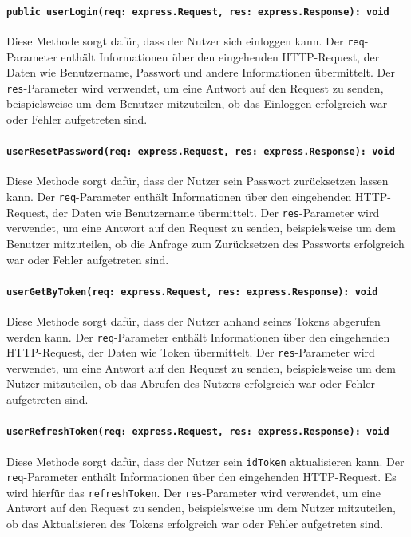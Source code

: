 \documentclass{entwurfsheft}
\begin{document}
\paragraph{\texttt{public userLogin(req: express.Request, res: express.Response): void}}
Diese Methode sorgt dafür, dass der Nutzer sich einloggen kann. Der \texttt{req}-Parameter enthält Informationen über den eingehenden HTTP-Request, der Daten wie Benutzername, Passwort und andere Informationen übermittelt. Der \texttt{res}-Parameter wird verwendet, um eine Antwort auf den Request zu senden, beispielsweise um dem Benutzer mitzuteilen, ob das Einloggen erfolgreich war oder Fehler aufgetreten sind.
\paragraph{\texttt{userResetPassword(req: express.Request, res: express.Response): void}}
Diese Methode sorgt dafür, dass der Nutzer sein Passwort zurücksetzen lassen kann. Der \texttt{req}-Parameter enthält Informationen über den eingehenden HTTP-Request, der Daten wie Benutzername übermittelt. Der \texttt{res}-Parameter wird verwendet, um eine Antwort auf den Request zu senden, beispielsweise um dem Benutzer mitzuteilen, ob die Anfrage zum Zurücksetzen des Passworts erfolgreich war oder Fehler aufgetreten sind. 
\paragraph{\texttt{userGetByToken(req: express.Request, res: express.Response): void}}
Diese Methode sorgt dafür, dass der Nutzer anhand seines Tokens abgerufen werden kann. Der \texttt{req}-Parameter enthält Informationen über den eingehenden HTTP-Request, der Daten wie Token übermittelt. Der \texttt{res}-Parameter wird verwendet, um eine Antwort auf den Request zu senden, beispielsweise um dem Nutzer mitzuteilen, ob das Abrufen des Nutzers erfolgreich war oder Fehler aufgetreten sind.
\paragraph{\texttt{userRefreshToken(req: express.Request, res: express.Response): void}}
Diese Methode sorgt dafür, dass der Nutzer sein \texttt{idToken} aktualisieren kann. Der \texttt{req}-Parameter enthält Informationen über den eingehenden HTTP-Request. Es wird hierfür das \texttt{refreshToken}. Der \texttt{res}-Parameter wird verwendet, um eine Antwort auf den Request zu senden, beispielsweise um dem Nutzer mitzuteilen, ob das Aktualisieren des Tokens erfolgreich war oder Fehler aufgetreten sind.
\end{document}
